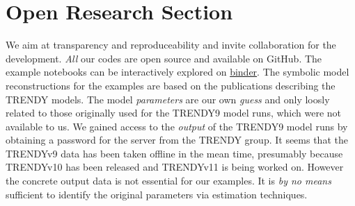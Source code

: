 





%
%

\section*{Open Research Section}
We aim at transparency and reproduceability and invite collaboration for
the development. \emph{All} our codes are open source and available on
GitHub. 
The example notebooks can be interactively explored on
\href{https://mybinder.org/v2/gh/MPIBGC-TEE/bgc_md2/binder}{binder}.  
The symbolic model reconstructions for the examples are based on the
publications describing the TRENDY models.  
The model \emph{parameters} are our own \emph{guess} 
and only loosly related to those originally used for the TRENDY9 model runs, 
which were not available to us. 
We gained access to the \emph{output} of the TRENDY9 model runs by obtaining a password for
the server from the TRENDY group. 
It seems that the TRENDYv9 data has been taken offline in the mean time, presumably because TRENDYv10 has been released and TRENDYv11 is being worked on. 
However the concrete output data is not essential for our examples.
It is \emph{by no means}
sufficient to identify the original parameters via estimation techniques.
